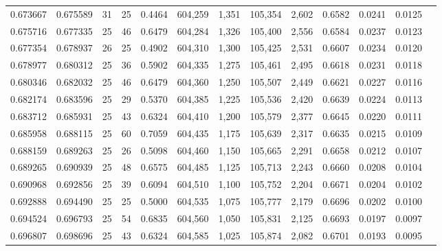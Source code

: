 \begin{tabular}{rrrrrrrrrrrrr}
0.673667 & 0.675589 &    31 &  25 &                                     0.4464 & 604,259 &   1,351 & 105,354 &   2,602 & 0.6582 & 0.0241 & 0.0125 \\
0.675716 & 0.677335 &    25 &  46 &                                     0.6479 & 604,284 &   1,326 & 105,400 &   2,556 & 0.6584 & 0.0237 & 0.0123 \\
0.677354 & 0.678937 &    26 &  25 &                                     0.4902 & 604,310 &   1,300 & 105,425 &   2,531 & 0.6607 & 0.0234 & 0.0120 \\
0.678977 & 0.680312 &    25 &  36 &                                     0.5902 & 604,335 &   1,275 & 105,461 &   2,495 & 0.6618 & 0.0231 & 0.0118 \\
0.680346 & 0.682032 &    25 &  46 &                                     0.6479 & 604,360 &   1,250 & 105,507 &   2,449 & 0.6621 & 0.0227 & 0.0116 \\
0.682174 & 0.683596 &    25 &  29 &                                     0.5370 & 604,385 &   1,225 & 105,536 &   2,420 & 0.6639 & 0.0224 & 0.0113 \\
0.683712 & 0.685931 &    25 &  43 &                                     0.6324 & 604,410 &   1,200 & 105,579 &   2,377 & 0.6645 & 0.0220 & 0.0111 \\
0.685958 & 0.688115 &    25 &  60 &                                     0.7059 & 604,435 &   1,175 & 105,639 &   2,317 & 0.6635 & 0.0215 & 0.0109 \\
0.688159 & 0.689263 &    25 &  26 &                                     0.5098 & 604,460 &   1,150 & 105,665 &   2,291 & 0.6658 & 0.0212 & 0.0107 \\
0.689265 & 0.690939 &    25 &  48 &                                     0.6575 & 604,485 &   1,125 & 105,713 &   2,243 & 0.6660 & 0.0208 & 0.0104 \\
0.690968 & 0.692856 &    25 &  39 &                                     0.6094 & 604,510 &   1,100 & 105,752 &   2,204 & 0.6671 & 0.0204 & 0.0102 \\
0.692888 & 0.694490 &    25 &  25 &                                     0.5000 & 604,535 &   1,075 & 105,777 &   2,179 & 0.6696 & 0.0202 & 0.0100 \\
0.694524 & 0.696793 &    25 &  54 &                                     0.6835 & 604,560 &   1,050 & 105,831 &   2,125 & 0.6693 & 0.0197 & 0.0097 \\
0.696807 & 0.698696 &    25 &  43 &                                     0.6324 & 604,585 &   1,025 & 105,874 &   2,082 & 0.6701 & 0.0193 & 0.0095 \\

\end{tabular}
